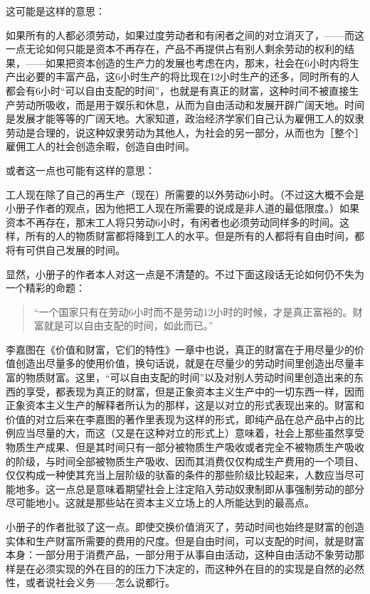 这可能是这样的意思：

如果所有的人都必须劳动，如果过度劳动者和有闲者之间的对立消灭了，——而这一点无论如何只能是资本不再存在，产品不再提供占有别人剩余劳动的权利的结果，——如果把资本创造的生产力的发展也考虑在内，那末，社会在6小时内将生产出必要的丰富产品，这6小时生产的将比现在12小时生产的还多，同时所有的人都会有6小时“可以自由支配的时间”，也就是有真正的财富，这种时间不被直接生产劳动所吸收，而是用于娱乐和休息，从而为自由活动和发展开辟广阔天地。时间是发展才能等等的广阔天地。大家知道，政治经济学家们自己认为雇佣工人的奴隶劳动是合理的，说这种奴隶劳动为其他人，为社会的另一部分，从而也为［整个］雇佣工人的社会创造余暇，创造自由时间。

或者这一点也可能有这样的意思：

工人现在除了自己的再生产（现在）所需要的以外劳动6小时。（不过这大概不会是小册子作者的观点，因为他把工人现在所需要的说成是非人道的最低限度。）如果资本不再存在，那末工人将只劳动6小时，有闲者也必须劳动同样多的时间。这样，所有的人的物质财富都将降到工人的水平。但是所有的人都将有自由时间，都将有可供自己发展的时间。

显然，小册子的作者本人对这一点是不清楚的。不过下面这段话无论如何仍不失为一个精彩的命题：

\begin{quote}{“一个国家只有在劳动6小时而不是劳动12小时的时候，才是真正富裕的。财富就是可以自由支配的时间，如此而已。”}\end{quote}

李嘉图在《价值和财富，它们的特性》一章中也说，真正的财富在于用尽量少的价值创造出尽量多的使用价值，换句话说，就是在尽量少的劳动时间里创造出尽量丰富的物质财富。这里，“可以自由支配的时间”以及对别人劳动时间里创造出来的东西的享受，都表现为真正的财富，但是正象资本主义生产中的一切东西一样，因而正象资本主义生产的解释者所认为的那样，这是以对立的形式表现出来的。财富和价值的对立后来在李嘉图的著作里表现为这样的形式，即纯产品在总产品中占的比例应当尽量的大，而这（又是在这种对立的形式上）意味着，社会上那些虽然享受物质生产成果、但是其时间只有一部分被物质生产吸收或者完全不被物质生产吸收的阶级，与时间全部被物质生产吸收、因而其消费仅仅构成生产费用的一个项目、仅仅构成一种使其充当上层阶级的驮畜的条件的那些阶级比较起来，人数应当尽可能地多。这一点总是意味着期望社会上注定陷入劳动奴隶制即从事强制劳动的部分尽可能地小。这就是那些站在资本主义立场上的人所能达到的最高点。

小册子的作者批驳了这一点。即使交换价值消灭了，劳动时间也始终是财富的创造实体和生产财富所需要的费用的尺度。但是自由时间，可以支配的时间，就是财富本身：一部分用于消费产品，一部分用于从事自由活动，这种自由活动不象劳动那样是在必须实现的外在目的的压力下决定的，而这种外在目的的实现是自然的必然性，或者说社会义务——怎么说都行。


